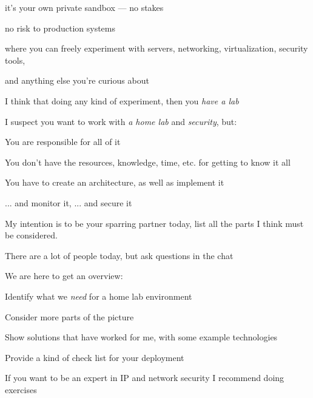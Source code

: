 \documentclass[Screen16to9,17pt]{foils}
\begin{document}
\begin{list2}
\item it's your own private sandbox — no stakes
\item no risk to production systems
\item where you can freely experiment with servers, networking, virtualization, security tools,
\item and anything else you're curious about
\item I think that doing any kind of experiment, then you \emph{have a lab}
\end{list2}





I suspect you want to work with \emph{a home lab} and \emph{security}, but:
\begin{list2}
\item You are responsible for all of it
\item You don't have the resources, knowledge, time, etc. for getting to know it all
\item You have to create an architecture, as well as implement it
\item ... and monitor it, ... and secure it

\end{list2}

My intention is to be your sparring partner today, list all the parts I think must be considered.

There are a lot of people today, but ask questions in the chat


We are here to get an overview:
\begin{list2}
\item Identify what we \emph{need} for a home lab environment
\item Consider more parts of the picture
\item Show solutions that have worked for me, with some example technologies
\item Provide a kind of check list for your deployment
\end{list2}


If you want to be an expert in IP and network security I recommend doing exercises
\end{document}
